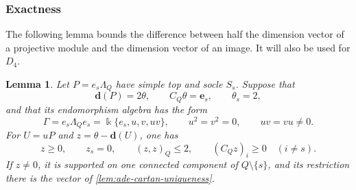 \documentclass[a4paper,11pt,reqno]{amsart}
\newtheorem{lemma}[lemma]{Lemma}
\theoremstyle{definition}
\theoremstyle{plain}
\numberwithin{equation}{section}
\newcommand{\kk}{\Bbbk}
\begin{document}
\subsubsection{Exactness}

The following lemma bounds the difference between half the dimension
vector of a projective module and the dimension vector of an image.
It will also be used for \(D_4\).

\begin{lemma}
\label{lem:ade-image-dimensions}
Let \(P=e_s\Lambda_Q\) have simple top and socle \(S_s\).
Suppose that
\[
 \mathbf d(P)=2\theta,\qquad C_Q\theta=\mathbf e_s,
 \qquad\theta_s=2,
\]
and that its endomorphism algebra has the form
\[
 \Gamma=e_s\Lambda_Qe_s=\kk\{e_s,u,v,uv\},
 \qquad u^2=v^2=0,\qquad uv=vu\ne0.
\]
For \(U=uP\) and \(z=\theta-\mathbf d(U)\), one has
\begin{equation}
\label{eq:ade-image-bound}
 z\geq0,\qquad z_s=0,\qquad
 (z,z)_Q\leq2,\qquad (C_Qz)_i\geq0\quad(i\ne s).
\end{equation}
If \(z\ne0\), it is supported on one connected component of
\(Q\setminus\{s\}\), and its restriction there is the vector
of \cref{lem:ade-cartan-uniqueness}.
\end{lemma}
\end{document}

